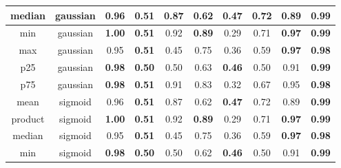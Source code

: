 \begin{table*}[!b]
\begin{tabular}{|c|c|c|c|c|c|c|c|c|c|}
        \hline
                    median &        gaussian &                         0.96 &             \textbf{0.51} &                   0.87 &                      0.62 &               \textbf{0.47} &                     0.72 &                  0.89 &          \textbf{0.99} \\
        \hline
                    min &        gaussian &                \textbf{1.00} &             \textbf{0.51} &                   0.92 &             \textbf{0.89} &                        0.29 &                     0.71 &         \textbf{0.97} &          \textbf{0.99} \\
        \hline
                    max &        gaussian &                         0.95 &             \textbf{0.51} &                   0.45 &                      0.75 &                        0.36 &                     0.59 &         \textbf{0.97} &          \textbf{0.98} \\
        \hline
                    p25 &        gaussian &                \textbf{0.98} &             \textbf{0.50} &                   0.50 &                      0.63 &               \textbf{0.46} &                     0.50 &                  0.91 &          \textbf{0.99} \\
        \hline
                    p75 &        gaussian &                \textbf{0.98} &             \textbf{0.51} &                   0.91 &                      0.83 &                        0.32 &                     0.67 &                  0.95 &          \textbf{0.98} \\
        \hline
                    mean &         sigmoid &                         0.96 &             \textbf{0.51} &                   0.87 &                      0.62 &               \textbf{0.47} &                     0.72 &                  0.89 &          \textbf{0.99} \\
        \hline
                product &         sigmoid &                \textbf{1.00} &             \textbf{0.51} &                   0.92 &             \textbf{0.89} &                        0.29 &                     0.71 &         \textbf{0.97} &          \textbf{0.99} \\
        \hline
                    median &         sigmoid &                         0.95 &             \textbf{0.51} &                   0.45 &                      0.75 &                        0.36 &                     0.59 &         \textbf{0.97} &          \textbf{0.98} \\
        \hline
                    min &         sigmoid &                \textbf{0.98} &             \textbf{0.50} &                   0.50 &                      0.62 &               \textbf{0.46} &                     0.50 &                  0.91 &          \textbf{0.99} \\

\end{tabular}
\end{table*}
